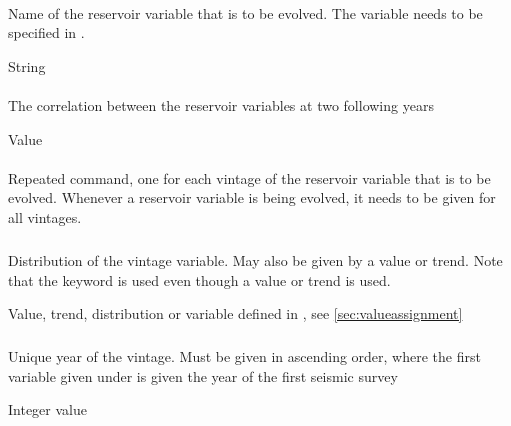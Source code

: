 {\paragraph{}
 \slist
   \item \Description Name of the reservoir variable that is to be evolved. The variable needs to be specified in .
   \item \Argument String
   \item \Default
 \elist

\paragraph{}
 \slist
   \item \Description The correlation between the reservoir variables at two following years
   \item \Argument Value
   \item {}
 \elist

\paragraph{}
 \slist
   \item \Description Repeated command, one for each vintage of the reservoir variable that is to be evolved. Whenever a reservoir variable is being evolved, it needs to be given for all vintages.
   \item \Argument
   \item \Default
 \elist

\subparagraph{}
 \slist
   \item \Description Distribution of the vintage variable. May also be given by a value or trend. Note that the keyword  is used even though a value or trend is used.
  \item \Argument Value, trend, distribution or variable defined in , see \autoref{sec:valueassignment}
   \item \Default 
 \elist

\subparagraph{}
 \slist
   \item \Description Unique year of the vintage. Must be given in ascending order, where the first variable given under  is given the year of the first seismic survey
   \item \Argument Integer value
   \item \Default 
 \elist

}
